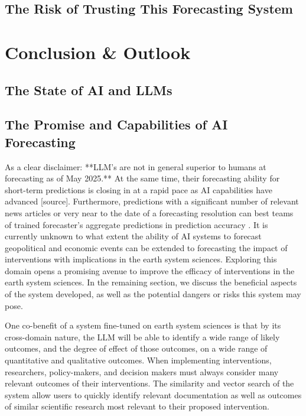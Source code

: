 \documentclass[12pt,a4paper]{article}
\begin{document}
\subsection{The Risk of Trusting This Forecasting System}
\clearpage
\section{Conclusion \& Outlook}
\label{sec:conclusion_outlook}

\subsection{The State of AI and LLMs}
\subsection{The Promise and Capabilities of AI Forecasting}

As a clear disclaimer: **LLM's are not in general superior to humans at forecasting as of May 2025.** At the same time, their forecasting ability for short-term predictions is closing in at a rapid pace as AI capabilities have advanced [source]. Furthermore, predictions with a significant number of relevant news articles or very near to the date of a forecasting resolution can best teams of trained forecaster's aggregate predictions in prediction accuracy . It is currently unknown to what extent the ability of AI systems to forecast geopolitical and economic events can be extended to forecasting the impact of interventions with implications in the earth system sciences. Exploring this domain opens a promising avenue to improve the efficacy of interventions in the earth system sciences. In the remaining section, we discuss the beneficial aspects of the system developed, as well as the potential dangers or risks this system may pose.

One co-benefit of a system fine-tuned on earth system sciences is that by its cross-domain nature, the LLM will be able to identify a wide range of likely outcomes, and the degree of effect of those outcomes, on a wide range of quantitative and qualitative outcomes. When implementing interventions, researchers, policy-makers, and decision makers must always consider many relevant outcomes of their interventions. The similarity and vector search of the system allow users to quickly identify relevant documentation as well as outcomes of similar scientific research most relevant to their proposed intervention.
\end{document}
